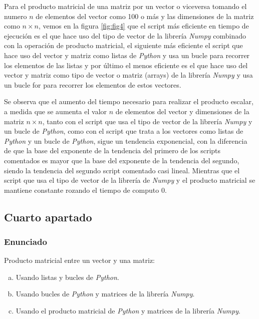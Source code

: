 \documentclass[12pt,twoside]{article}
\begin{document}
Para el producto matricial de una matriz por un vector o viceversa tomando el numero $n$ de elementos del vector como 100 o más y las dimensiones de la matriz como $n \times n$, vemos en la figura \ref{fig:fig4} que el script más eficiente en tiempo de ejecución es el que hace uso del tipo de vector de la librería \textit{Numpy} combinado con la operación de producto matricial, el siguiente más eficiente el script que hace uso del vector y matriz como listas de \textit{Python} y usa un bucle para recorrer los elementos de las listas y por último el menos eficiente es el que hace uso del vector y matriz como tipo de vector o matriz (arrays) de la librería \textit{Numpy} y usa un bucle for para recorrer los elementos de estos vectores.

Se observa que el aumento del tiempo necesario para realizar el producto escalar, a medida que se aumenta el valor $n$ de elementos del vector y dimensiones de la matriz $n \times n$, tanto con el script que usa el tipo de vector de la librería \textit{Numpy} y un bucle de \textit{Python}, como con el script que trata a los vectores como listas de \textit{Python} y un bucle de \textit{Python}, sigue un tendencia exponencial, con la diferencia de que la base del exponente de la tendencia del primero de los scripts comentados es mayor que la base del exponente de la tendencia del segundo, siendo la tendencia del segundo script comentado casi lineal. Mientras que el script que usa el tipo de vector de la librería de \textit{Numpy} y el producto matricial se mantiene constante rozando el tiempo de computo 0.

\subsection{Cuarto apartado}

\subsubsection{Enunciado}

\noindent
Producto matricial entre un vector y una matriz:

\begin{enumerate}[(a)]

\item Usando listas y bucles de \textit{Python}.

\item Usando bucles de \textit{Python} y matrices de la librería \textit{Numpy}.

\item Usando el producto matricial de \textit{Python} y matrices de la librería \textit{Numpy}.

\end{enumerate}
\end{document}
